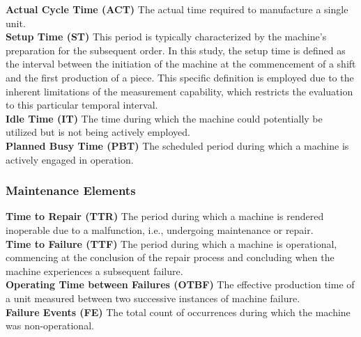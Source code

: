 {\textbf{Actual Cycle Time (ACT)}
The actual time required to manufacture a single unit.\\
\textbf{Setup Time (ST)}
This period is typically characterized by the machine's preparation for the subsequent order. In this study, the setup time is defined as the interval between the initiation of the machine at the commencement of a shift and the first production of a piece. This specific definition is employed due to the inherent limitations of the measurement capability, which restricts the evaluation to this particular temporal interval.\\
\textbf{Idle Time (IT)}
The time during which the machine could potentially be utilized but is not being actively employed.\\
\textbf{Planned Busy Time (PBT)}
The scheduled period during which a machine is actively engaged in operation.

\subsubsection{Maintenance Elements}
\textbf{Time to Repair (TTR)}
The period during which a machine is rendered inoperable due to a malfunction, i.e., undergoing maintenance or repair.\\
\textbf{Time to Failure (TTF)}
The period during which a machine is operational, commencing at the conclusion of the repair process and concluding when the machine experiences a subsequent failure.\\
\textbf{Operating Time between Failures (OTBF)}
The effective production time of a unit measured between two successive instances of machine failure.\\
\textbf{Failure Events (FE)}
The total count of occurrences during which the machine was non-operational.

}
